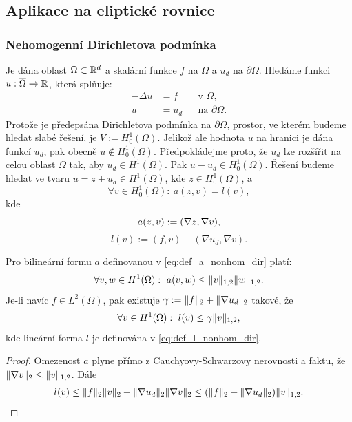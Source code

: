 \subsection{Aplikace na eliptické rovnice}


\subsubsection{Nehomogenní Dirichletova podmínka}

Je dána oblast $\Omega\subset\mathbb R^d$ a skalární funkce $f$ na $\Omega$ a $u_d$ na $\partial\Omega$.
Hledáme funkci $u:\overline\Omega\rightarrow\mathbb R$, která splňuje:
\[ \begin{aligned}
-\Delta u &= f &&\text{v }\Omega,\\
u&=u_d && \text{na }\partial\Omega.
\end{aligned} \]
Protože je předepsána Dirichletova podmínka na $\partial\Omega$, prostor, ve kterém budeme hledat slabé řešení, je $V:=H^1_0(\Omega)$.
Jelikož ale hodnota $u$ na hranici je dána funkcí $u_d$, pak obecně $u\notin H^1_0(\Omega)$.
Předpokládejme proto, že $u_d$ lze rozšířit na celou oblast $\Omega$ tak, aby $u_d\in H^1(\Omega)$.
Pak $u-u_d\in H^1_0(\Omega)$.
Řešení budeme hledat ve tvaru $u=z+u_d\in H^1(\Omega)$, kde $z\in H^1_0(\Omega)$, a
\[ \forall v\in H^1_0(\Omega):~a(z,v)=l(v), \]
kde
\begin{equation}\label{eq:def_a_nonhom_dir}
a(z,v) := (\nabla z, \nabla v),
\end{equation}
\begin{equation}\label{eq:def_l_nonhom_dir}
l(v) := (f,v) - (\nabla u_d,\nabla v).
\end{equation}
\begin{veta}
Pro bilineární formu $a$ definovanou v \eqref{eq:def_a_nonhom_dir} platí:
\[ \forall v,w\in H^1(\Omega):~a(v,w) \le \|v\|_{1,2}\|w\|_{1,2}. \]
Je-li navíc $f\in L^2(\Omega)$, pak existuje $\gamma:=\|f\|_2+\|\nabla u_d\|_2$ takové, že
\[ \forall v\in H^1(\Omega):~l(v) \le \gamma\|v\|_{1,2}, \]
kde lineární forma $l$ je definována v \eqref{eq:def_l_nonhom_dir}.
\end{veta}
\begin{proof}
Omezenost $a$ plyne přímo z Cauchyovy-Schwarzovy nerovnosti a faktu, že $\|\nabla v\|_2\le\|v\|_{1,2}$.
Dále
\[ l(v)\le \|f\|_2\|v\|_2 + \|\nabla u_d\|_2\|\nabla v\|_2
\le (\|f\|_2+\|\nabla u_d\|_2)\|v\|_{1,2}. \]
\end{proof}


